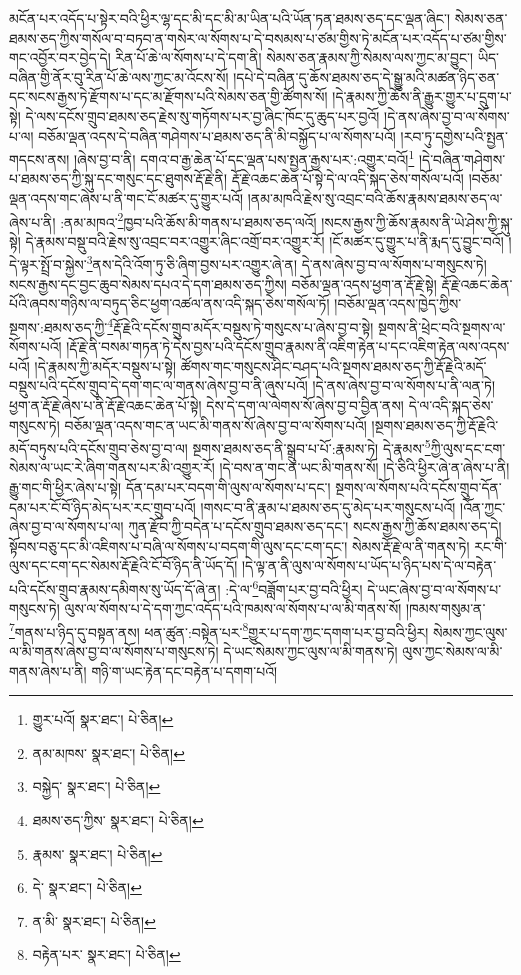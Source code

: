 མངོན་པར་འདོད་པ་སྟེར་བའི་ཕྱིར་ལྷ་དང་མི་དང་མི་མ་ཡིན་པའི་ཡོན་ཏན་ཐམས་ཅད་དང་ལྡན་ཞིང་། སེམས་ཅན་ཐམས་ཅད་ཀྱིས་གསོལ་བ་བཏབ་ན་གསེར་ལ་སོགས་པ་དེ་བསམས་པ་ཙམ་གྱིས་ཏེ་མངོན་པར་འདོད་པ་ཙམ་གྱིས་གང་འབྱོར་བར་བྱེད་དེ། རིན་པོ་ཆེ་ལ་སོགས་པ་དེ་དག་ནི། སེམས་ཅན་རྣམས་ཀྱི་སེམས་ལས་ཀྱང་མ་བྱུང་། ཡིད་བཞིན་གྱི་ནོར་བུ་རིན་པོ་ཆེ་ལས་ཀྱང་མ་འོངས་སོ། །དཔེ་དེ་བཞིན་དུ་ཆོས་ཐམས་ཅད་དེ་སྒྱུ་མའི་མཚན་ཉིད་ཅན་དང་སངས་རྒྱས་ཏེ་རྫོགས་པ་དང་མ་རྫོགས་པའི་སེམས་ཅན་གྱི་ཚོགས་སོ། །དེ་རྣམས་ཀྱི་ཆོས་ནི་རྒྱུར་གྱུར་པ་དྲུག་པ་སྟེ། དེ་ལས་དངོས་གྲུབ་ཐམས་ཅད་རྗེས་སུ་གཏོགས་པར་བྱ་ཞིང་ཁོང་དུ་ཆུད་པར་བྱའོ། །དེ་ནས་ཞེས་བྱ་བ་ལ་སོགས་པ་ལ། བཅོམ་ལྡན་འདས་དེ་བཞིན་གཤེགས་པ་ཐམས་ཅད་ནི་མི་བསྐྱོད་པ་ལ་སོགས་པའོ། །རབ་ཏུ་དགྱེས་པའི་སྤྱན་གདངས་ནས། །ཞེས་བྱ་བ་ནི། དགའ་བ་རྒྱ་ཆེན་པོ་དང་ལྡན་པས་སྤྱན་རྒྱས་པར་:འགྱུར་བའོ།\footnote{གྱུར་པའོ།  སྣར་ཐང་།  པེ་ཅིན། } །དེ་བཞིན་གཤེགས་པ་ཐམས་ཅད་ཀྱི་སྐུ་དང་གསུང་དང་ཐུགས་རྡོ་རྗེ་ནི། རྡོ་རྗེ་འཆང་ཆེན་པོ་སྟེ་དེ་ལ་འདི་སྐད་ཅེས་གསོལ་པའོ། །བཅོམ་ལྡན་འདས་གང་ཞེས་པ་ནི་གང་ངོ་མཚར་དུ་གྱུར་པའོ། །ནམ་མཁའི་རྗེས་སུ་འབྲང་བའི་ཆོས་རྣམས་ཐམས་ཅད་ལ་ཞེས་པ་ནི། :ནམ་མཁའ་\footnote{ནམ་མཁས་  སྣར་ཐང་།  པེ་ཅིན། }ཁྱབ་པའི་ཆོས་མི་གནས་པ་ཐམས་ཅད་ལའོ། །སངས་རྒྱས་ཀྱི་ཆོས་རྣམས་ནི་ཡེ་ཤེས་ཀྱི་སྐུ་སྟེ། དེ་རྣམས་བསྡུ་བའི་རྗེས་སུ་འབྲང་བར་འགྱུར་ཞིང་འགྲོ་བར་འགྱུར་རོ། །ངོ་མཚར་དུ་གྱུར་པ་ནི་རྨད་དུ་བྱུང་བའོ། །དེ་ལྟར་སྤྲོ་བ་སྐྱེས་\footnote{བསྐྱེད་  སྣར་ཐང་།  པེ་ཅིན། }ནས་དེའི་འོག་ཏུ་ཅི་ཞིག་བྱས་པར་འགྱུར་ཞེ་ན། དེ་ནས་ཞེས་བྱ་བ་ལ་སོགས་པ་གསུངས་ཏེ། སངས་རྒྱས་དང་བྱང་ཆུབ་སེམས་དཔའ་དེ་དག་ཐམས་ཅད་ཀྱིས། བཅོམ་ལྡན་འདས་ཕྱག་ན་རྡོ་རྗེ་སྟེ། རྡོ་རྗེ་འཆང་ཆེན་པོའི་ཞབས་གཉིས་ལ་བཏུད་ཅིང་ཕྱག་འཚལ་ནས་འདི་སྐད་ཅེས་གསོལ་ཏོ། །བཅོམ་ལྡན་འདས་ཁྱེད་ཀྱིས་སྔགས་:ཐམས་ཅད་ཀྱི་\footnote{ཐམས་ཅད་ཀྱིས་  སྣར་ཐང་།  པེ་ཅིན། }རྡོ་རྗེའི་དངོས་གྲུབ་མདོར་བསྡུས་ཏེ་གསུངས་པ་ཞེས་བྱ་བ་སྟེ། སྔགས་ནི་ཕྲེང་བའི་སྔགས་ལ་སོགས་པའོ། །རྡོ་རྗེ་ནི་བསམ་གཏན་ཏེ་དེས་བྱས་པའི་དངོས་གྲུབ་རྣམས་ནི་འཇིག་རྟེན་པ་དང་འཇིག་རྟེན་ལས་འདས་པའོ། །དེ་རྣམས་ཀྱི་མདོར་བསྡུས་པ་སྟེ། ཚོགས་གང་གསུངས་ཤིང་བཤད་པའི་སྔགས་ཐམས་ཅད་ཀྱི་རྡོ་རྗེའི་མདོ་བསྡུས་པའི་དངོས་གྲུབ་དེ་དག་གང་ལ་གནས་ཞེས་བྱ་བ་ནི་ཞུས་པའོ། །དེ་ནས་ཞེས་བྱ་བ་ལ་སོགས་པ་ནི་ལན་ཏེ། ཕྱག་ན་རྡོ་རྗེ་ཞེས་པ་ནི་རྡོ་རྗེ་འཆང་ཆེན་པོ་སྟེ། དེས་དེ་དག་ལ་ལེགས་སོ་ཞེས་བྱ་བ་བྱིན་ནས། དེ་ལ་འདི་སྐད་ཅེས་གསུངས་ཏེ། བཅོམ་ལྡན་འདས་གང་ན་ཡང་མི་གནས་སོ་ཞེས་བྱ་བ་ལ་སོགས་པའོ། །སྔགས་ཐམས་ཅད་ཀྱི་རྡོ་རྗེའི་མདོ་བཏུས་པའི་དངོས་གྲུབ་ཅེས་བྱ་བ་ལ། སྔགས་ཐམས་ཅད་ནི་སྒྲུབ་པ་པོ་:རྣམས་ཏེ། དེ་རྣམས་\footnote{རྣམས་  སྣར་ཐང་།  པེ་ཅིན། }ཀྱི་ལུས་དང་ངག་སེམས་ལ་ཡང་རེ་ཞིག་གནས་པར་མི་འགྱུར་རོ། །དེ་བས་ན་གང་ན་ཡང་མི་གནས་སོ། །དེ་ཅིའི་ཕྱིར་ཞེ་ན་ཞེས་པ་ནི། རྒྱུ་གང་གི་ཕྱིར་ཞེས་པ་སྟེ། དོན་དམ་པར་བདག་གི་ལུས་ལ་སོགས་པ་དང་། སྔགས་ལ་སོགས་པའི་དངོས་གྲུབ་དོན་དམ་པར་ངོ་བོ་ཉིད་མེད་པར་རང་གྲུབ་པའོ། །གསང་བ་ནི་རྣམ་པ་ཐམས་ཅད་དུ་མེད་པར་གསུངས་པའོ། །འོན་ཀྱང་ཞེས་བྱ་བ་ལ་སོགས་པ་ལ། ཀུན་རྫོབ་ཀྱི་བདེན་པ་དངོས་གྲུབ་ཐམས་ཅད་དང་། སངས་རྒྱས་ཀྱི་ཆོས་ཐམས་ཅད་དེ། སྟོབས་བཅུ་དང་མི་འཇིགས་པ་བཞི་ལ་སོགས་པ་བདག་གི་ལུས་དང་ངག་དང་། སེམས་རྡོ་རྗེ་ལ་ནི་གནས་ཏེ། རང་གི་ལུས་དང་ངག་དང་སེམས་རྡོ་རྗེའི་ངོ་བོ་ཉིད་ནི་ཡོད་དོ། །དེ་ལྟ་ན་ནི་ལུས་ལ་སོགས་པ་ཡོད་པ་ཉིད་པས་དེ་ལ་བརྟེན་པའི་དངོས་གྲུབ་རྣམས་དམིགས་སུ་ཡོད་དོ་ཞེ་ན། :དེ་ལ་\footnote{དེ་  སྣར་ཐང་།  པེ་ཅིན། }བཟློག་པར་བྱ་བའི་ཕྱིར། དེ་ཡང་ཞེས་བྱ་བ་ལ་སོགས་པ་གསུངས་ཏེ། ལུས་ལ་སོགས་པ་དེ་དག་ཀྱང་འདོད་པའི་ཁམས་ལ་སོགས་པ་ལ་མི་གནས་སོ། །ཁམས་གསུམ་ན་\footnote{ན་མི་  སྣར་ཐང་།  པེ་ཅིན། }གནས་པ་ཉིད་དུ་བསྟན་ནས། ཕན་ཚུན་:བསྟེན་པར་\footnote{བརྟེན་པར་  སྣར་ཐང་།  པེ་ཅིན། }གྱུར་པ་དག་ཀྱང་དགག་པར་བྱ་བའི་ཕྱིར། སེམས་ཀྱང་ལུས་ལ་མི་གནས་ཞེས་བྱ་བ་ལ་སོགས་པ་གསུངས་ཏེ། དེ་ཡང་སེམས་ཀྱང་ལུས་ལ་མི་གནས་ཏེ། ལུས་ཀྱང་སེམས་ལ་མི་གནས་ཞེས་པ་ནི། གཉི་ག་ཡང་རྟེན་དང་བརྟེན་པ་དགག་པའོ། 